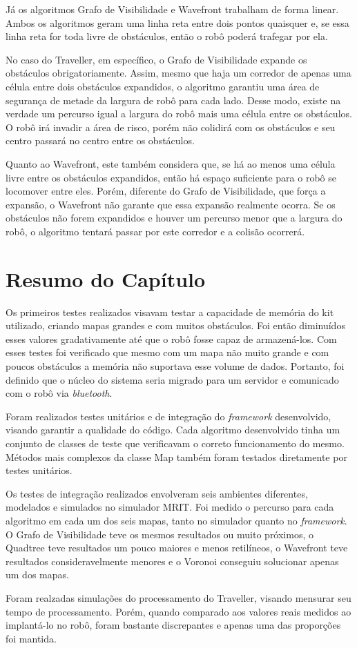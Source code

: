 Já os algoritmos Grafo de Visibilidade e Wavefront trabalham de forma linear. Ambos os algoritmos geram uma linha reta entre dois pontos quaisquer e, se essa linha reta for toda livre de obstáculos, então o robô poderá trafegar por ela.

No caso do Traveller, em específico, o Grafo de Visibilidade expande os obstáculos obrigatoriamente. Assim, mesmo que haja um corredor de apenas uma célula entre dois obstáculos expandidos, o algoritmo garantiu uma área de segurança de metade da largura de robô para cada lado. Desse modo, existe na verdade um percurso igual a largura do robô mais uma célula entre os obstáculos. O robô irá invadir a área de risco, porém não colidirá com os obstáculos e seu centro passará no centro entre os obstáculos.

Quanto ao Wavefront, este também considera que, se há ao menos uma célula livre entre os obstáculos expandidos, então há espaço suficiente para o robô se locomover entre eles. Porém, diferente do Grafo de Visibilidade, que força a expansão, o Wavefront não garante que essa expansão realmente ocorra. Se os obstáculos não forem expandidos e houver um percurso menor que a largura do robô, o algoritmo tentará passar por este corredor e a colisão ocorrerá.

\section{Resumo do Capítulo}

Os primeiros testes realizados visavam testar a capacidade  de memória do kit utilizado, criando mapas grandes e com muitos obstáculos. Foi então diminuídos esses valores gradativamente até que o robô fosse capaz de armazená-los. Com esses testes foi verificado que mesmo com um mapa não muito grande e com poucos obstáculos a memória não suportava esse volume de dados. Portanto, foi definido que o núcleo do sistema seria migrado para um servidor e comunicado com o robô via \textit{bluetooth}.

Foram realizados testes unitários e de integração do \textit{framework} desenvolvido, visando garantir a qualidade do código. Cada algoritmo desenvolvido tinha um conjunto de classes de teste que verificavam o correto funcionamento do mesmo. Métodos mais complexos da classe Map também foram testados diretamente por testes unitários.

Os testes de integração realizados envolveram seis ambientes diferentes, modelados e simulados no simulador MRIT. Foi medido o percurso para cada algoritmo em cada um dos seis mapas, tanto no simulador quanto no \textit{framework}. O Grafo de Visibilidade teve os mesmos resultados ou muito próximos, o Quadtree teve resultados um pouco maiores e menos retilíneos, o Wavefront teve resultados consideravelmente menores e o Voronoi conseguiu solucionar apenas um dos mapas.

Foram realzadas simulações do processamento do Traveller, visando mensurar seu tempo de processamento. Porém, quando comparado aos valores reais medidos ao implantá-lo no robô, foram bastante discrepantes e apenas uma das proporções foi mantida.